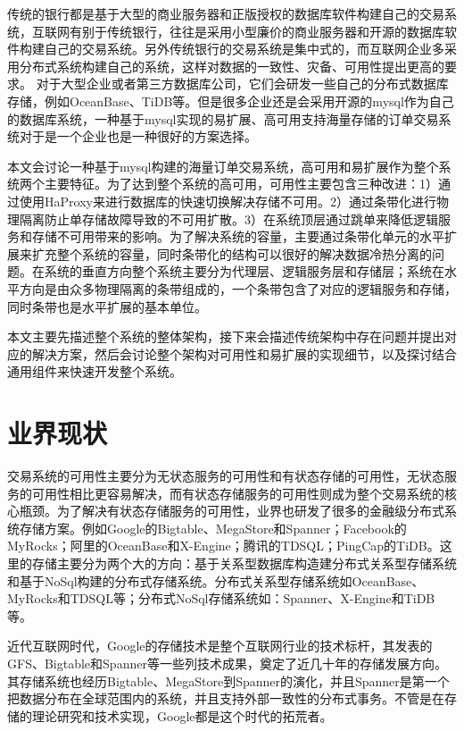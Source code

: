 \documentclass[letterpaper,twocolumn,10pt]{article}
\begin{document}
传统的银行都是基于大型的商业服务器和正版授权的数据库软件构建自己的交易系统，互联网有别于传统银行，往往是采用小型廉价的商业服务器和开源的数据库软件构建自己的交易系统。另外传统银行的交易系统是集中式的，而互联网企业多采用分布式系统构建自己的系统，这样对数据的一致性、灾备、可用性提出更高的要求。
对于大型企业或者第三方数据库公司，它们会研发一些自己的分布式数据库存储，例如OceanBase、TiDB等。但是很多企业还是会采用开源的mysql作为自己的数据库系统，一种基于mysql实现的易扩展、高可用支持海量存储的订单交易系统对于是一个企业也是一种很好的方案选择。

本文会讨论一种基于mysql构建的海量订单交易系统，高可用和易扩展作为整个系统两个主要特征。为了达到整个系统的高可用，可用性主要包含三种改进：1）通过使用HaProxy来进行数据库的快速切换解决存储不可用。2）通过条带化进行物理隔离防止单存储故障导致的不可用扩散。3）在系统顶层通过跳单来降低逻辑服务和存储不可用带来的影响。为了解决系统的容量，主要通过条带化单元的水平扩展来扩充整个系统的容量，同时条带化的结构可以很好的解决数据冷热分离的问题。在系统的垂直方向整个系统主要分为代理层、逻辑服务层和存储层；系统在水平方向是由众多物理隔离的条带组成的，一个条带包含了对应的逻辑服务和存储，同时条带也是水平扩展的基本单位。

本文主要先描述整个系统的整体架构，接下来会描述传统架构中存在问题并提出对应的解决方案，然后会讨论整个架构对可用性和易扩展的实现细节，以及探讨结合通用组件来快速开发整个系统。

\section{业界现状}

交易系统的可用性主要分为无状态服务的可用性和有状态存储的可用性，无状态服务的可用性相比更容易解决，而有状态存储服务的可用性则成为整个交易系统的核心瓶颈。为了解决有状态存储服务的可用性，业界也研发了很多的金融级分布式系统存储方案。例如Google的Bigtable、MegaStore和Spanner；Facebook的MyRocks；阿里的OceanBase和X-Engine；腾讯的TDSQL；PingCap的TiDB。这里的存储主要分为两个大的方向：基于关系型数据库构造建分布式关系型存储系统和基于NoSql构建的分布式存储系统。分布式关系型存储系统如OceanBase、MyRocks和TDSQL等；分布式NoSql存储系统如：Spanner、X-Engine和TiDB等。

近代互联网时代，Google的存储技术是整个互联网行业的技术标杆，其发表的GFS、Bigtable和Spanner等一些列技术成果，奠定了近几十年的存储发展方向。其存储系统也经历Bigtable、MegaStore到Spanner的演化，并且Spanner是第一个把数据分布在全球范围内的系统，并且支持外部一致性的分布式事务。不管是在存储的理论研究和技术实现，Google都是这个时代的拓荒者。
\end{document}
